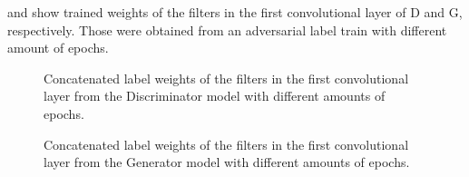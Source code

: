 \FloatBarrier
\noindent
{} and  show trained weights of the filters in the first convolutional layer of D and G, respectively.
Those were obtained from an adversarial label train with different amount of epochs.
\begin{figure}[!ht]
  \centering
  \quad
  \caption{Concatenated label weights of the filters in the first convolutional layer from the Discriminator model with different amounts of epochs.}
  \label{fig:nn_adv_label_weights_d}
\end{figure}
\FloatBarrier
\noindent
\begin{figure}[!ht]
  \centering
  \quad
  \caption{Concatenated label weights of the filters in the first convolutional layer from the Generator model with different amounts of epochs.}
  \label{fig:nn_adv_label_weights_g}
\end{figure}
